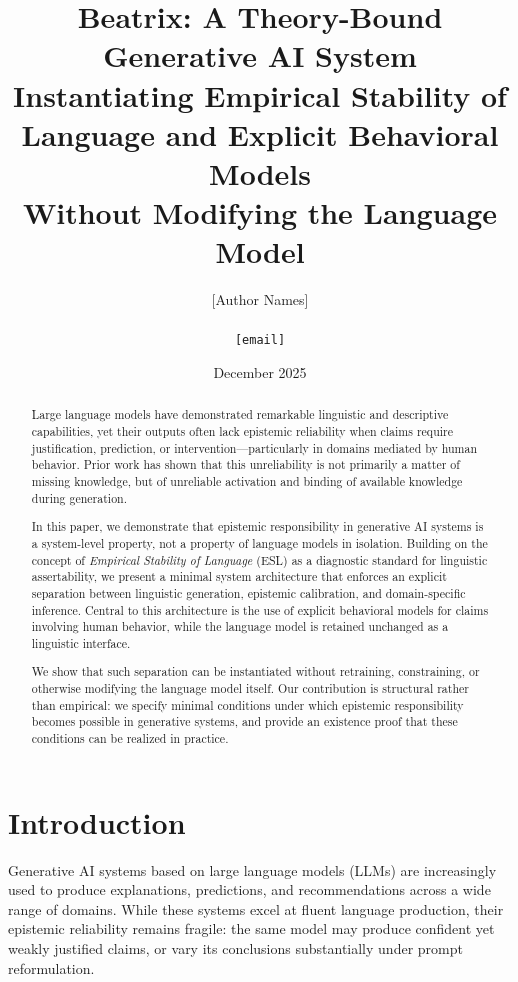 \documentclass[11pt,a4paper]{article}
\title{\textbf{Beatrix: A Theory-Bound Generative AI System}\\[0.5em]
\large Instantiating Empirical Stability of Language and Explicit Behavioral Models\\Without Modifying the Language Model}
\author{
  [Author Names]\\
  [Affiliation]\\
  \texttt{[email]}
}
\date{December 2025}
\begin{document}

\maketitle

\begin{abstract}
Large language models have demonstrated remarkable linguistic and descriptive capabilities, yet their outputs often lack epistemic reliability when claims require justification, prediction, or intervention---particularly in domains mediated by human behavior. Prior work has shown that this unreliability is not primarily a matter of missing knowledge, but of unreliable activation and binding of available knowledge during generation.

In this paper, we demonstrate that epistemic responsibility in generative AI systems is a system-level property, not a property of language models in isolation. Building on the concept of \emph{Empirical Stability of Language} (ESL) as a diagnostic standard for linguistic assertability, we present a minimal system architecture that enforces an explicit separation between linguistic generation, epistemic calibration, and domain-specific inference. Central to this architecture is the use of explicit behavioral models for claims involving human behavior, while the language model is retained unchanged as a linguistic interface.

We show that such separation can be instantiated without retraining, constraining, or otherwise modifying the language model itself. Our contribution is structural rather than empirical: we specify minimal conditions under which epistemic responsibility becomes possible in generative systems, and provide an existence proof that these conditions can be realized in practice.
\end{abstract}


\section{Introduction}

Generative AI systems based on large language models (LLMs) are increasingly used to produce explanations, predictions, and recommendations across a wide range of domains. While these systems excel at fluent language production, their epistemic reliability remains fragile: the same model may produce confident yet weakly justified claims, or vary its conclusions substantially under prompt reformulation.
\end{document}
